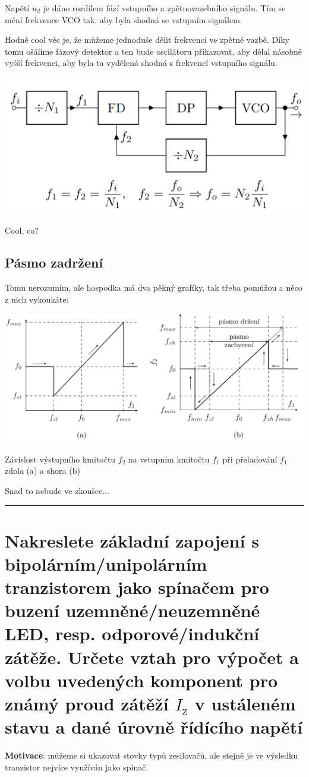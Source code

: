 \documentclass[a4paper,12pt]{article}   %
\begin{document}
Napětí $u_d$ je dáno rozdílem fází vstupního a zpětnovazebního signálu. Tím se mění frekvence VCO tak, aby byla shodná se vstupním signálem.

Hodně cool věc je, že můžeme jednoduše dělit frekvenci ve zpětné vazbě. Díky tomu ošálíme fázový detektor a ten bude oscilátoru přikazovat, aby dělal násobně vyšší frekvenci, aby byla ta vydělená shodná s frekvencí vstupního signálu.

\begin{graf}[h!]
    \centering
    \includegraphics[width = .6\textwidth]{fazovy_zaves-deleni.PNG}
\end{graf}
Cool, co?

\subsection*{Pásmo zadržení}
Tomu nerozumím, ale hospodka má dva pěkný grafíky, tak třeba pomůžou a něco z nich vykoukáte:
\begin{graf}[h!]
    \centering
    \includegraphics[width=\textwidth]{pasmo_zadrzeni.PNG}
    \caption{Závislost výstupního kmitočtu $f_2$ na vstupním kmitočtu $f_1$ při přelaďování $f_1$ zdola (a) a shora (b)}
    \label{graf:pasmo:zadrzeni}
\end{graf}

Snad to nebude ve zkoušce...
 \\






\hrule%
\section{Nakreslete základní zapojení s bipolárním/unipolárním tranzistorem jako spínačem pro buzení uzemněné/neuzemněné LED, resp. odporové/indukční zátěže. Určete vztah pro výpočet a volbu uvedených komponent pro známý proud zátěží $I_\text{z}$ v ustáleném stavu a dané úrovně řídícího napětí}
\textbf{Motivace}: můžeme si ukazovat stovky typů zesilovačů, ale stejně je ve výsledku tranzistor nejvíce využíván jako spínač. 
\end{document}
